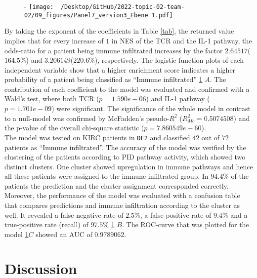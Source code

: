 \documentclass[
  parskip,
  oneside]{scrreprt}
\begin{document}
\begin{figure}[h]-
  \texttt{[image: ~/Desktop/GitHub/2022-topic-02-team-02/09\_figures/Panel7\_version3\_Ebene 1.pdf]}
  \caption{}
  \label{log}
\end{figure}

By taking the exponent of the coefficients in Table \cref{tab}, the
returned value implies that for every increase of \(1\) in NES of the
TCR and the IL-1 pathway, the odds-ratio for a patient being immune
infiltrated increases by the factor \(2.64517\)(\(164.5\)\%) and
\(3.206149\)(\(220.6\)\%), respectively. The logistic function plots of
each independent variable show that a higher enrichment score indicates
a higher probability of a patient being classified as ``Immune
infiltrated'' \cref{log} \(A\). The contribution of each coefficient to
the model was evaluated and confirmed with a Wald's test, where both TCR
(\(p= 1.590e-06\)) and IL-1 pathway (\(p= 1.701e-09\)) were significant.
The significance of the whole model in contrast to a null-model was
confirmed by McFadden's pseudo-\(R^2\) (\(R_{Mc}^2=0.5074508\)) and the
p-value of the overall chi-square statistic (\(p=7.860549e-60\)).\\
The model was tested on KIRC patients in \texttt{DF2} and classified
\(42\) out of \(72\) patients as ``Immune infiltrated''. The accuracy of
the model was verified by the clustering of the patients according to
PID pathway activity, which showed two distinct clusters. One cluster
showed upregulation in immune pathways and hence all these patients were
assigned to the immune infiltrated group. In \(94.4\)\% of the patients
the prediction and the cluster assignment corresponded correctly.
Moreover, the performance of the model was evaluated with a confusion
table that compares predictions and immune infiltration according to the
cluster as well. It revealed a false-negative rate of \(2.5\)\%, a
false-positive rate of \(9.4\)\% and a true-positive rate (recall) of
\(97.5\)\% \cref{log} \(B\). The ROC-curve that was plotted for the
model \cref{log}\(C\) showed an AUC of \(0.9789062\).

\hypertarget{discussion}{%
\chapter{Discussion}\label{discussion}}
\end{document}
